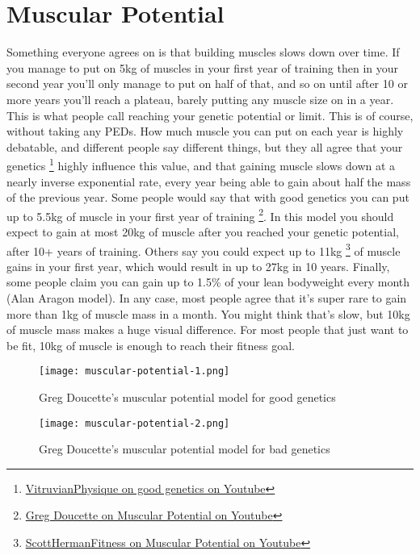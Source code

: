 \documentclass[openany, 12pt]{book}
\begin{document}
        \section{Muscular Potential}

        Something everyone agrees on is that building muscles slows down over time. If you manage to put on 5kg of muscles in your first year of training then in your second year you'll only
        manage to put on half of that, and so on until after 10 or more years you'll reach a plateau, barely putting any muscle size on in a year. This is what people call reaching your genetic
        potential or limit. This is of course, without taking any PEDs. How much muscle you can put on each year is highly debatable, and different people say different things, but they all
        agree that your genetics
        \footnote{\href{https://www.youtube.com/watch?v=KC4Sc_XgmZ0}{VitruvianPhysique on good genetics on Youtube}}
        highly influence this value, and that gaining muscle slows down at a nearly inverse exponential rate, every year being able to gain about half the mass of the previous year.
        Some people would say that with good genetics you can put up to 5.5kg of muscle in your first year of training
        \footnote{\href{https://www.youtube.com/watch?v=r4Hyli_4frY}{Greg Doucette on Muscular Potential on Youtube}}. In this model you should expect to gain at most 20kg of muscle after you reached
        your genetic potential, after 10+ years of training. Others say you could expect up to 11kg
        \footnote{\href{https://www.youtube.com/watch?v=vQ2vxH4eOGw}{ScottHermanFitness on Muscular Potential on Youtube}} of muscle gains in your first year, which would result in up to 27kg in 10 years.
        Finally, some people claim you can gain up to 1.5\% of your lean bodyweight every month (Alan Aragon model). In any case, most people agree that it's super rare to gain more than 1kg of muscle mass
        in a month. You might think that's slow, but 10kg of muscle mass makes a huge visual difference. For most people that just want to be fit, 10kg of muscle is enough to reach their fitness goal.

        \begin{figure}[h]
		\centering
		\texttt{[image: muscular-potential-1.png]}
		\caption{Greg Doucette’s muscular potential model for good genetics}
		\label{fig14}
	\end{figure}

        \begin{figure}[h]
		\centering
		\texttt{[image: muscular-potential-2.png]}
		\caption{Greg Doucette’s muscular potential model for bad genetics}
		\label{fig15}
	\end{figure}
\end{document}
